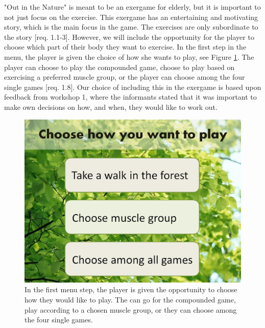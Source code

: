 "Out in the Nature" is meant to be an exergame for elderly, but it is important to not just focus on the exercise. This exergame has an entertaining and motivating story, which is the main focus in the game. The exercises are only subordinate to the story [req. 1.1-3]. However, we will include the opportunity for the player to choose which part of their body they want to exercise. In the first step in the menu, the player is given the choice of how she wants to play, see Figure \ref{fig:menuStart}. The player can choose to play the compounded game, choose to play based on exercising a preferred muscle group, or the player can choose among the four single games [req. 1.8]. Our choice of including this in the exergame is based upon feedback from workshop 1, where the informants stated that it was important to make own decisions on how, and when, they would like to work out.                     

\begin{figure} [H]
\centering
\includegraphics[scale=0.24]{choosePlay.jpg}
\caption[The menu - start]{In the first menu step, the player is given the opportunity to choose how they would like to play. The can go for the compounded game, play according to a chosen muscle group, or they can choose among the four single games.}
\label{fig:menuStart}
\end{figure} 

